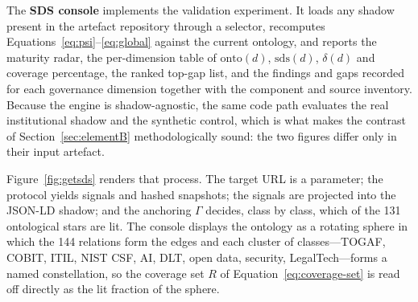 \documentclass[engproc,article,submit,moreauthors]{Definitions/mdpi}
\begin{document}
The \textbf{SDS console} implements the validation experiment. It loads any shadow present in the artefact repository through a selector, recomputes Equations~\eqref{eq:psi}--\eqref{eq:global} against the current ontology, and reports the maturity radar, the per-dimension table of $\mathrm{onto}(d)$, $\mathrm{sds}(d)$, $\delta(d)$ and coverage percentage, the ranked top-gap list, and the findings and gaps recorded for each governance dimension together with the component and source inventory. Because the engine is shadow-agnostic, the same code path evaluates the real institutional shadow and the synthetic control, which is what makes the contrast of Section~\ref{sec:elementB} methodologically sound: the two figures differ only in their input artefact.


Figure~\ref{fig:getsds} renders that process. The target URL is a parameter; the protocol yields signals and hashed snapshots; the signals are projected into the JSON-LD shadow; and the anchoring $\Gamma$ decides, class by class, which of the 131 ontological stars are lit. The console displays the ontology as a rotating sphere in which the 144 relations form the edges and each cluster of classes---TOGAF, COBIT, ITIL, NIST CSF, AI, DLT, open data, security, LegalTech---forms a named constellation, so the coverage set $R$ of Equation~\eqref{eq:coverage-set} is read off directly as the lit fraction of the sphere.
\end{document}
